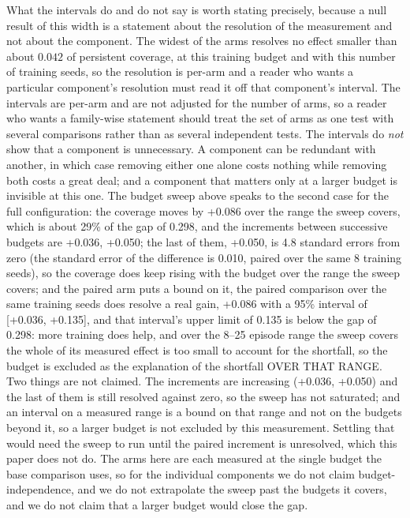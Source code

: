\documentclass[conference]{IEEEtran}
\begin{document}
What the intervals do and do not say is worth stating precisely, because a
null result of this width is a statement about the resolution of the
measurement and not about the component.  The widest of the arms resolves no effect smaller than about $0.042$ of persistent coverage, at this training budget and with this number of training seeds, so the resolution is per-arm and a reader who wants a particular component's resolution must read it off that component's interval.  The
intervals are per-arm and are not adjusted for the number of arms, so a
reader who wants a family-wise statement should treat the set of arms as
one test with several comparisons rather than as several independent
tests.  The intervals do \emph{not} show that a component is unnecessary.
A component can be redundant with another, in which case removing either
one alone costs nothing while removing both costs a great deal; and a
component that matters only at a larger budget is invisible at this one.
The budget sweep above speaks to the second case for the full
configuration: the coverage moves by +0.086 over the range the sweep covers, which is about 29\% of the gap of 0.298, and the increments between successive budgets are +0.036, +0.050; the last of them, +0.050, is 4.8 standard errors from zero (the standard error of the difference is 0.010, paired over the same 8 training seeds), so the coverage does keep rising with the budget over the range the sweep covers; and the paired arm puts a bound on it,
the paired comparison over the same training seeds does resolve a real gain, +0.086 with a 95\% interval of [+0.036, +0.135], and that interval's upper limit of 0.135 is below the gap of 0.298: more training does help, and over the 8--25 episode range the sweep covers the whole of its measured effect is too small to account for the shortfall, so the budget is excluded as the explanation of the shortfall OVER THAT RANGE.  Two things are not claimed.  The increments are increasing (+0.036, +0.050) and the last of them is still resolved against zero, so the sweep has not saturated; and an interval on a measured range is a bound on that range and not on the budgets beyond it, so a larger budget is not excluded by this measurement.  Settling that would need the sweep to run until the paired increment is unresolved, which this paper does not do.  The arms
here are each measured at the single budget the base comparison uses, so
for the individual components we do not claim budget-independence, and
we do not extrapolate the sweep past the budgets it covers, and we do not claim that a larger budget would close the gap.
\end{document}
